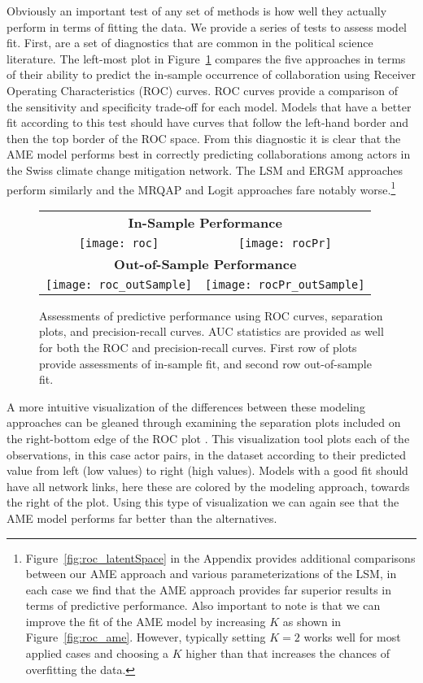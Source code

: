 Obviously an important test of any set of methods is how well they actually perform in terms of fitting the data. We provide a series of tests to assess model fit. First, are a set of diagnostics that are common in the political science literature. The left-most plot in Figure~\ref{fig:roc} compares the five approaches in terms of their ability to predict the in-sample occurrence of collaboration using Receiver Operating Characteristics (ROC) curves. ROC curves provide a comparison of the sensitivity and specificity trade-off for each model. Models that have a better fit according to this test should have curves that follow the left-hand border and then the top border of the ROC space. From this diagnostic it is clear that the AME model performs best in correctly predicting collaborations among actors in the Swiss climate change mitigation network. The LSM and ERGM approaches perform similarly and the MRQAP and Logit approaches fare notably worse.\footnote{Figure~\ref{fig:roc_latentSpace} in the Appendix provides additional comparisons between our AME approach and various parameterizations of the LSM, in each case we find that the AME approach provides far superior results in terms of predictive performance. Also important to note is that we can improve the fit of the AME model by increasing $K$ as shown in Figure~\ref{fig:roc_ame}. However, typically setting $K=2$ works well for most applied cases and choosing a $K$ higher than that increases the chances of overfitting the data.} 

\begin{figure}[ht]
	\centering
	\begin{tabular}{cc}
	\multicolumn{2}{c}{\textbf{In-Sample Performance}} \\
	\texttt{[image: roc]} & 
	\texttt{[image: rocPr]}	\\
	\multicolumn{2}{c}{\textbf{Out-of-Sample Performance}} \\	
	\texttt{[image: roc\_outSample]} & 
	\texttt{[image: rocPr\_outSample]}	
	\end{tabular}
	\caption{Assessments of predictive performance using ROC curves, separation plots, and precision-recall curves. AUC statistics are provided as well for both the ROC and precision-recall curves. First row of plots provide assessments of in-sample fit, and second row out-of-sample fit.}
	\label{fig:roc}
\end{figure}
\FloatBarrier

A more intuitive visualization of the differences between these modeling approaches can be gleaned through examining the separation plots included on the right-bottom edge of the ROC plot \citep{greenhill:etal:2011}. This visualization tool plots each of the observations, in this case actor pairs, in the dataset according to their predicted value from left (low values) to right (high values). Models with a good fit should have all network links, here these are colored by the modeling approach, towards the right of the plot. Using this type of visualization we can again see that the AME model performs far better than the alternatives.

